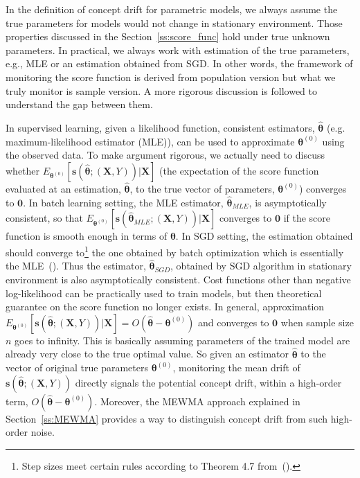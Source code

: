 \documentclass[twoside,11pt]{article}
\begin{document}
In the definition of concept drift for parametric models, we always assume the true parameters for models would not change in stationary environment. Those properties discussed in the Section~\ref{ss:score_func} hold under true unknown parameters. In practical, we always work with estimation of the true parameters, e.g., MLE or an estimation obtained from SGD. In other words, the framework of monitoring the score function is derived from population version but what we truly monitor is sample version. A more rigorous discussion is followed to understand the gap between them.

In supervised learning, given a likelihood function, consistent estimators, $\hat {\bm {\theta}}$ (e.g. maximum-likelihood estimator (MLE)), can be used to approximate {$\bm { \theta}^{ (0)}$} using the observed data. To make argument rigorous, we actually need to discuss whether $E_{\bm { \theta} ^{ (0)}}[\bm{s}(\hat{\bm { \theta}};(\bm {X}, Y))|\bm {X}]$ (the expectation of the score function evaluated at an estimation, $\hat { \bm { \theta}}$, to the true vector of parameters, $\bm { \theta} ^{ (0)}$) converges to $\bm {0}$. In batch learning setting, the MLE estimator, $\hat { \bm { \theta}}_ {MLE}$, is asymptotically consistent, so that $E_{\bm { \theta} ^{ (0)}}[\bm{s}(\hat{\bm { \theta}} _{MLE};(\bm {X}, Y))|\bm {X}]$ converges to $\bm {0}$ if the score function is smooth enough in terms of $\bm { \theta}$. In SGD setting, the estimation obtained should converge to\footnote{Step sizes meet certain rules according to Theorem 4.7 from~(\cite{bottou2018optimization}).} the one obtained by batch optimization which is essentially the MLE~(\cite{bottou2018optimization}). Thus the estimator, $\hat {\bm { \theta}} _{SGD} $, obtained by SGD algorithm in stationary environment is also asymptotically consistent. Cost functions other than negative log-likelihood can be practically used to train models, but then theoretical guarantee on the score function no longer exists. In general, approximation {$E _{\bm { \theta} ^{ (0)}}[\bm{s}(\hat{\bm { \theta}};(\bm {X}, Y))|\bm{X}] = O (\hat{\bm { \theta}} - \bm { \theta}^{ (0)}) $} and converges to $\bm {0}$ when sample size $n$ goes to infinity. This is basically assuming parameters of the trained model are already very close to the true optimal value. So given an estimator $\hat {\bm { \theta}}$ to the vector of original true parameters $\bm { \theta}^{(0)}$, monitoring the mean {drift} of $\bm{s} (\hat{\bm { \theta}};(\bm {X}, Y))$ directly signals the potential concept drift, within a high-order term, {$O(\hat{\bm { \theta}} - \bm { \theta} ^{ (0)})$.} Moreover, the MEWMA approach explained in Section~\ref{ss:MEWMA} provides a way to distinguish concept drift from such high-order noise.
\end{document}
